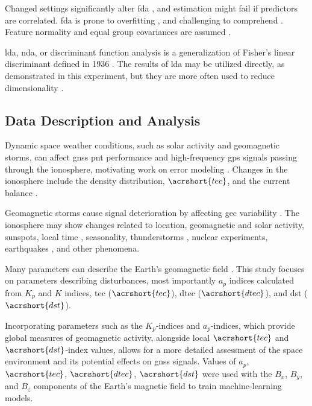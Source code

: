 \documentclass[sn-mathphys-num]{sn-jnl}%
\begin{document}
Changed settings significantly alter \acrshort{fda} \cite{hallgren2019species}, and estimation might fail if predictors are correlated. \acrshort{fda} is prone to overfitting \cite{thuiller2016ensemble}, and challenging to comprehend \cite{quillfeldt2017influence}. Feature normality and equal group covariances are assumed \cite{zhang2019using, wetcher2011analyzing}.

\acrshort{lda}, \acrfull{nda}, or discriminant function analysis \cite{cohen2013applied} is a generalization of Fisher's linear discriminant defined in 1936 \cite{fisher1936use, archive765Discriminant, rao1948utilization}. The results of \acrshort{lda} may be utilized directly, as demonstrated in this experiment, but they are more often used to reduce dimensionality \cite{hansen2005using}.

\subsection{Data Description and Analysis}

Dynamic space weather conditions, such as solar activity and geomagnetic storms, can affect  \acrshort{gnss} \acrshort{pnt} performance and high-frequency \acrshort{gps} signals passing through the ionosphere, motivating work on error modeling \cite{klobuchar1986design, zolesi2014ionospheric}. Changes in the ionosphere include the density distribution, $\acrshort{tec}$, and the current balance \cite{komjathy2023global}.

Geomagnetic storms cause signal deterioration by affecting \acrfull{gec} variability \cite{NOAA2024aRadioCommunications}. The ionosphere may show changes related to location, geomagnetic and solar activity, sunspots, local time \cite{kotz2005encyclopedia}, seasonality, thunderstorms \cite{vellinov1992ionospheric}, nuclear experiments, earthquakes \cite{liu20142013}, and other phenomena.

Many parameters can describe the Earth's geomagnetic field \cite{ulukavak2018analysis}. This study focuses on parameters describing disturbances, most importantly $a_{p}$ indices calculated from $K_{p}$ and $K$ indices, \acrlong{tec} ($\acrshort{tec}$), \acrlong{dtec} ($\acrshort{dtec}$), and \acrlong{dst} ($\acrshort{dst}$). 

Incorporating parameters such as the $K_{p}$-indices and $a_{p}$-indices, which provide global measures of geomagnetic activity, alongside local $\acrshort{tec}$ and $\acrshort{dst}$-index values, allows for a more detailed assessment of the space environment and its potential effects on \acrshort{gnss} signals. Values of $a_{p}$, $\acrshort{tec}$, $\acrshort{dtec}$, $\acrshort{dst}$ were used with the $B_x$, $B_y$, and $B_z$ components of the Earth's magnetic field to train machine-learning models.
\end{document}
